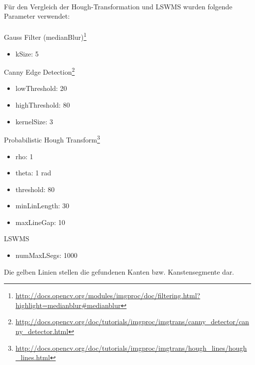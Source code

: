 \paragraph{}
Für den Vergleich der Hough-Transformation und LSWMS wurden folgende Parameter verwendet:
\paragraph{}
Gauss Filter (medianBlur)\footnote{\protect\url{http://docs.opencv.org/modules/imgproc/doc/filtering.html?highlight=medianblur#medianblur}}
\begin{itemize}
	\item kSize: 5
\end{itemize}
Canny Edge Detection\footnote{\protect\url{http://docs.opencv.org/doc/tutorials/imgproc/imgtrans/canny_detector/canny_detector.html}}
\begin{itemize}
	\item lowThreshold: 20
	\item highThreshold: 80
	\item kernelSize: 3
\end{itemize}
Probabilistic Hough Transform\footnote{\protect\url{http://docs.opencv.org/doc/tutorials/imgproc/imgtrans/hough_lines/hough_lines.html}}
\begin{itemize}
	\item rho: 1
	\item theta: 1 rad
	\item threshold: 80
	\item minLinLength: 30
	\item maxLineGap: 10
\end{itemize}
LSWMS
\begin{itemize}
	\item numMaxLSegs: 1000
\end{itemize}

Die gelben Linien stellen die gefundenen Kanten bzw. Kanstensegmente dar.
\pagebreak

